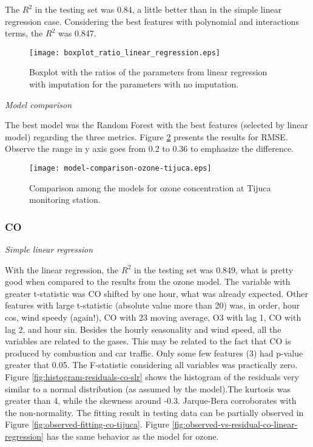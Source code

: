The $R^2$ in the testing set was 0.84, a little better than in the simple
linear regression case. Considering the best features with polynomial and
interactions terms, the $R^2$ was 0.847.

\begin{figure}
    \centering
    \texttt{[image: boxplot\_ratio\_linear\_regression.eps]}
    \caption{Boxplot with the ratios of the parameters from linear regression
    with imputation for the parameters with no imputation.}
    \label{fig:boxplot-linear-regression}
\end{figure}

\vspace{2mm}

{\em Model comparison} 

\vspace{2mm}

The best model was the Random Forest with the best features (selected by linear model) regarding the three metrics. Figure
\ref{fig:model-comparison-ozone-tijuca} presents the results for RMSE. Observe
the range in y axis goes from 0.2 to 0.36 to emphasize the difference.

\begin{figure}
    \centering
    \texttt{[image: model-comparison-ozone-tijuca.eps]}
    \caption{Comparison among the models for ozone concentration at Tijuca monitoring station.}
    \label{fig:model-comparison-ozone-tijuca}
\end{figure}

\subsubsection{CO}

{\em Simple linear regression}

\vspace{2mm}

With the linear regression, the $R^2$ in the testing set was 0.849,
what is pretty good when compared to the results from the ozone model. The variable with greater t-statistic
was CO shifted by one hour, what was already expected. Other features with
large t-statistic (absolute value more than
20) was, in
order, hour cos, wind speedy (again!), CO with 23 moving average, O3 with lag
1, CO with lag
2, and hour sin. Besides the hourly seasonality and wind speed, all the
variables are related to the gases. This may be related to the fact that CO is
produced by combustion and car traffic. Only some few features (3) had p-value
greater that 0.05. The F-statistic considering all variables was practically zero. Figure \ref{fig:histogram-residuals-co-slr} shows
the histogram of the residuals very similar to a normal distribution (as
assumed by the model).The kurtosis was greater than 4, while the skewness around
-0.3. Jarque-Bera corroborates with the non-normality. The fitting result in testing data can be
partially observed in Figure \ref{fig:observed-fitting-co-tijuca}.  Figure
\ref{fig:observed-vs-residual-co-linear-regression} has the same behavior as
the model for ozone.  

